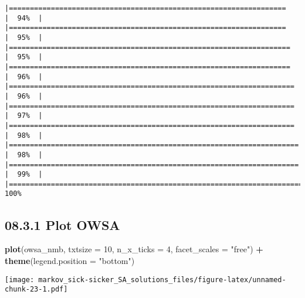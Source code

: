 \documentclass[
]{article}
\newenvironment{Shaded}{\begin{snugshade}}{\end{snugshade}}
\newcommand{\DataTypeTok}[1]{\textcolor[rgb]{0.13,0.29,0.53}{#1}}
\newcommand{\DecValTok}[1]{\textcolor[rgb]{0.00,0.00,0.81}{#1}}
\newcommand{\KeywordTok}[1]{\textcolor[rgb]{0.13,0.29,0.53}{\textbf{#1}}}
\newcommand{\NormalTok}[1]{#1}
\newcommand{\OperatorTok}[1]{\textcolor[rgb]{0.81,0.36,0.00}{\textbf{#1}}}
\newcommand{\StringTok}[1]{\textcolor[rgb]{0.31,0.60,0.02}{#1}}
\begin{document}
\begin{verbatim}
|==================================================================    |  94%  |                                                                              |==================================================================    |  95%  |                                                                              |===================================================================   |  95%  |                                                                              |===================================================================   |  96%  |                                                                              |====================================================================  |  96%  |                                                                              |====================================================================  |  97%  |                                                                              |====================================================================  |  98%  |                                                                              |===================================================================== |  98%  |                                                                              |===================================================================== |  99%  |                                                                              |======================================================================| 100%
\end{verbatim}

\hypertarget{plot-owsa}{%
\subsection{08.3.1 Plot OWSA}\label{plot-owsa}}

\begin{Shaded}
\begin{Highlighting}[]
\KeywordTok{plot}\NormalTok{(owsa_nmb, }\DataTypeTok{txtsize =} \DecValTok{10}\NormalTok{, }\DataTypeTok{n_x_ticks =} \DecValTok{4}\NormalTok{, }
     \DataTypeTok{facet_scales =} \StringTok{"free"}\NormalTok{) }\OperatorTok{+}
\StringTok{     }\KeywordTok{theme}\NormalTok{(}\DataTypeTok{legend.position =} \StringTok{"bottom"}\NormalTok{)}
\end{Highlighting}
\end{Shaded}

\texttt{[image: markov\_sick-sicker\_SA\_solutions\_files/figure-latex/unnamed-chunk-23-1.pdf]}
\end{document}
